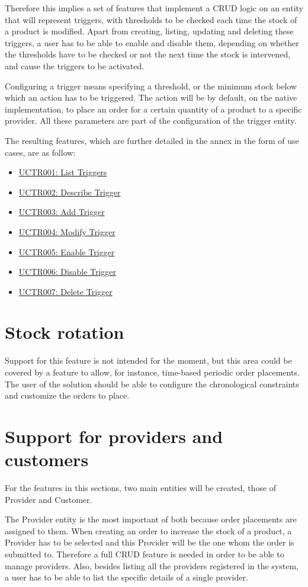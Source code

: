 Therefore this implies a set of features that implement a CRUD logic on an entity that will represent triggers, with thresholds to be checked each time the stock of a product is modified. Apart from creating, listing, updating and deleting these triggers, a user has to be able to enable and disable them, depending on whether the thresholds have to be checked or not the next time the stock is intervened, and cause the triggers to be activated.

Configuring a trigger means specifying a threshold, or the minimum stock below which an action has to be triggered. The action will be by default, on the native implementation, to place an order for a certain quantity of a product to a specific provider. All these parameters are part of the configuration of the trigger entity.

The resulting features, which are further detailed in the annex in the form of use cases, are as follow:
\hfill\break
\begin{itemize}
\item \hyperref[UCTR001]{UCTR001: List Triggers}
\item \hyperref[UCTR002]{UCTR002: Describe Trigger}
\item \hyperref[UCTR003]{UCTR003: Add Trigger}
\item \hyperref[UCTR004]{UCTR004: Modify Trigger}
\item \hyperref[UCTR005]{UCTR005: Enable Trigger}
\item \hyperref[UCTR006]{UCTR006: Disable Trigger}
\item \hyperref[UCTR007]{UCTR007: Delete Trigger}
\end{itemize}
\hfill\break
\section{Stock rotation}
Support for this feature is not intended for the moment, but this area could be covered by a feature to allow, for instance, time-based periodic order placements. The user of the solution should be able to configure the chronological constraints and customize the orders to place.

\section{Support for providers and customers}
For the features in this sections, two main entities will be created, those of Provider and Customer.

The Provider entity is the most important of both because order placements are assigned to them. When creating an order to increase the stock of a product, a Provider has to be selected and this Provider will be the one whom the order is submitted to. Therefore a full CRUD feature is needed in order to be able to manage providers. Also, besides listing all the providers registered in the system, a user has to be able to list the specific details of a single provider.


